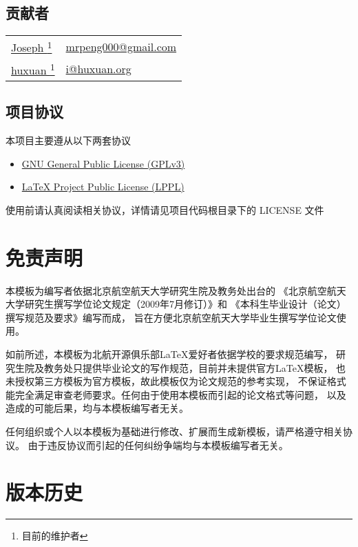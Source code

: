 \subsection{贡献者}
\begin{tabularx}{\textwidth}{@{\hspace{2em}}ll}
    \href{https://github.com/JosephPeng/}{Joseph \footnote{目前的维护者}} &
    \href{mailto:mrpeng000@gmail.com}{mrpeng000@gmail.com} \\
    \href{http://huxuan.org/}{huxuan \textsuperscript{1}} &
    \href{mailto:i@huxuan.org}{i@huxuan.org} \\
\end{tabularx}

\subsection{项目协议}
本项目主要遵从以下两套协议
\begin{itemize}
    \item \href{http://www.gnu.org/licenses/gpl.txt}
        {GNU General Public License (GPLv3)}
    \item \href{http://www.latex-project.org/lppl.txt}
        {\LaTeX{} Project Public License (LPPL)}
\end{itemize}
使用前请认真阅读相关协议，详情请见项目代码根目录下的 LICENSE 文件

\section{免责声明}
本模板为编写者依据北京航空航天大学研究生院及教务处出台的
《北京航空航天大学研究生撰写学位论文规定（2009年7月修订）》和
《本科生毕业设计（论文）撰写规范及要求》编写而成，
旨在方便北京航空航天大学毕业生撰写学位论文使用。

如前所述，本模板为北航开源俱乐部\LaTeX{}爱好者依据学校的要求规范编写，
研究生院及教务处只提供毕业论文的写作规范，目前并未提供官方\LaTeX{}模板，
也未授权第三方模板为官方模板，故此模板仅为论文规范的参考实现，
不保证格式能完全满足审查老师要求。任何由于使用本模板而引起的论文格式等问题，
以及造成的可能后果，均与本模板编写者无关。

任何组织或个人以本模板为基础进行修改、扩展而生成新模板，请严格遵守相关协议。
由于违反协议而引起的任何纠纷争端均与本模板编写者无关。

\section{版本历史}
\begin{itemize}
\end{itemize}
